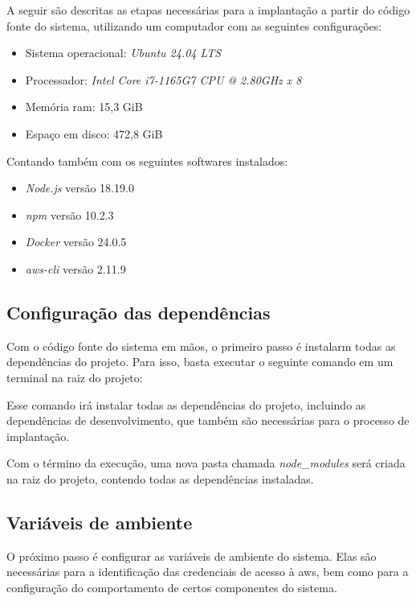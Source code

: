 A seguir são descritas as etapas necessárias para a implantação a partir do código fonte do sistema, utilizando um computador com as seguintes configurações:

\begin{itemize}
    \item Sistema operacional: \textit{Ubuntu 24.04 LTS}
    \item Processador: \textit{Intel Core i7-1165G7 CPU @ 2.80GHz x 8}
    \item Memória \gls{ram}: 15,3 GiB 
    \item Espaço em disco: 472,8 GiB
\end{itemize}

Contando também com os seguintes softwares instalados:

\begin{itemize}
    \item \textit{Node.js} versão 18.19.0
    \item \textit{npm} versão 10.2.3
    \item \textit{Docker} versão 24.0.5
    \item \textit{aws-cli} versão 2.11.9
\end{itemize}

\subsection{Configuração das dependências}
\label{subsec:configuracaoDasDependencias}

Com o código fonte do sistema em mãos, o primeiro passo é instalarm todas as dependências do projeto. Para isso, basta executar o seguinte comando em um terminal na raiz do projeto:


Esse comando irá instalar todas as dependências do projeto, incluindo as dependências de desenvolvimento, que também são necessárias para o processo de implantação.

Com o término da execução, uma nova pasta chamada \textit{node\_modules} será criada na raiz do projeto, contendo todas as dependências instaladas.

\subsection{Variáveis de ambiente}
\label{subsec:variaveisDeAmbienteEFeatureFlags}

O próximo passo é configurar as variáveis de ambiente do sistema. Elas são necessárias para a identificação das credenciais de acesso à \gls{aws}, bem como para a configuração do comportamento de certos componentes do sistema.

